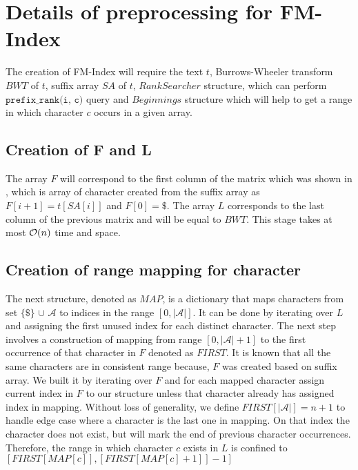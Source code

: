 \section{Details of preprocessing for FM-Index}

The creation of FM-Index will require the text $t$, Burrows-Wheeler transform $BWT$ of $t$, suffix array $SA$ of $t$, $RankSearcher$ structure, which can perform $\texttt{prefix\_rank(i, c)}$ query and $Beginnings$ structure which will help to get a range in which character $c$ occurs in a given array.

\subsection[Creation of F and L]{Creation of F and L}

The array $F$ will correspond to the first column of the matrix which was shown in , which is array of character created from the suffix array as $F[i+1] = t[SA[i]]$ and $F[0] = \$$. The array $L$ corresponds to the last column of the previous matrix and will be equal to $BWT$. This stage takes at most $\mathcal{O}(n)$ time and space.

\subsection{Creation of range mapping for character}

The next structure, denoted as $MAP$, is a dictionary that maps characters from set $\{\$\}$ $\cup$ $\mathcal{A}$ to indices in the range $[0, |\mathcal{A}|]$. It can be done by iterating over $L$ and assigning the first unused index for each distinct character.
\newline \newline \newline
The next step involves a construction of mapping from range $[0, |\mathcal{A}| + 1]$ to the first occurrence of that character in $F$ denoted as $FIRST$. It is known that all the same characters are in consistent range because, $F$ was created based on suffix array. We built it by iterating over $F$ and for each mapped character assign current index in $F$ to our structure unless that character already has assigned index in mapping. Without loss of generality, we define $FIRST[|\mathcal{A}|] = n + 1$ to handle edge case where a character is the last one in mapping. On that index the character does not exist, but will mark the end of previous character occurrences. Therefore, the range in which character $c$ exists in $L$ is confined to $[ FIRST[ MAP[ c ] ], 
 [ FIRST[ MAP[ c ] + 1 ] ] - 1 ]$

